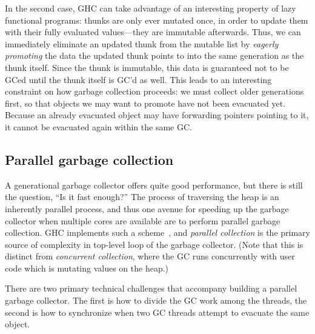 In the second case, GHC can take advantage of an interesting property of
lazy functional programs: thunks are only ever mutated once, in order to
update them with their fully evaluated values---they are immutable
afterwards.  Thus, we can immediately eliminate an updated thunk from
the mutable list by \emph{eagerly promoting} the data the updated thunk
points to into the same generation as the thunk itself.  Since the thunk
is immutable, this data is guaranteed not to be GCed until the thunk
itself is GC'd as well.  This leads to an interesting constraint on how
garbage collection proceeds: we must collect older generations first, so
that objects we may want to promote have not been evacuated yet.
Because an already evacuated object may have forwarding pointers
pointing to it, it cannot be evacuated again within the same GC.


\subsection{Parallel garbage collection}

A generational garbage collector offers quite good performance, but
there is still the question, ``Is it fast enough?''  The process of
traversing the heap is an inherently parallel process, and thus one
avenue for speeding up the garbage collector when multiple cores are
available are to perform parallel garbage collection.  GHC implements
such a scheme~\XXX{}, and \emph{parallel collection} is the primary source of
complexity in top-level loop of the garbage collector.  (Note that this
is distinct from \emph{concurrent collection}, where the GC runs concurrently
with user code which is mutating values on the heap.)

There are two primary technical challenges that accompany building a
parallel garbage collector.  The first is how to divide the GC work
among the threads, the second is how to synchronize when two GC threads
attempt to evacuate the same object.

